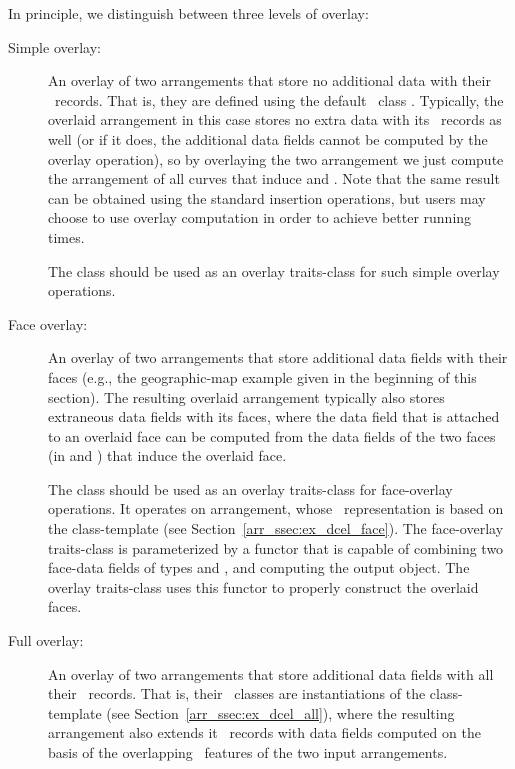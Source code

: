 In principle, we distinguish between three levels of overlay:
\begin{description}
\item[Simple overlay:]
An overlay of two arrangements that store no additional data
with their \dcel\ records. That is, they are defined using the default 
\dcel\ class . Typically, the overlaid
arrangement in this case stores no extra data with its \dcel\ records as
well (or if it does, the additional data fields cannot be computed by
the overlay operation), so by overlaying the two arrangement we just
compute the arrangement of all curves that induce  and .
Note that the same result can be obtained using the standard insertion
operations, but users may choose to use overlay computation in order to
achieve better running times.

The  class should be used as an overlay
traits-class for such simple overlay operations.
%
\item[Face overlay:]
An overlay of two arrangements that store additional data
fields with their faces (e.g., the geographic-map example
given in the beginning of this section). The resulting overlaid arrangement
typically also stores extraneous data fields with its faces, where the
data field that is attached to an overlaid face can be computed from the
data fields of the two faces (in  and ) that induce
the overlaid face.

The  class should be used as an overlay
traits-class for face-overlay operations. It operates on arrangement, whose
\dcel\ representation is based on the 
class-template (see Section~\ref{arr_ssec:ex_dcel_face}). The face-overlay
traits-class is parameterized by a functor that is capable of combining two
face-data fields of types  and
, and computing the output 
object. The overlay traits-class uses this functor to properly construct
the overlaid faces.
%
\item[Full overlay:]
An overlay of two arrangements that store additional data
fields with all their \dcel\ records. That is, their \dcel\ classes
are instantiations of the  class-template (see
Section~\ref{arr_ssec:ex_dcel_all}), where the resulting arrangement
also extends it \dcel\ records with data fields computed on the basis
of the overlapping \dcel\ features of the two input arrangements.
\end{description}

